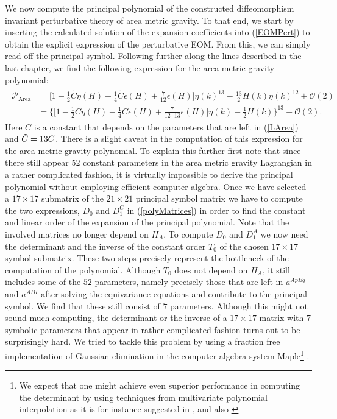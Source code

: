 We now compute the principal polynomial of the constructed diffeomorphism invariant perturbative theory of area metric gravity. To that end, we start by inserting the calculated solution of the expansion coefficients into (\ref{EOMPert}) to obtain the explicit expression of the perturbative EOM. From this, we can simply read off the principal symbol. Following further along the lines described in the last chapter, we find the following expression for the area metric gravity polynomial:
\begin{align} \label{AreaPoly}
\begin{aligned}
    \mathcal{P}_{\text{Area}} &= \bigl[1 - \frac{1}{2} \tilde{C}\eta(H) - \frac{1}{4} \tilde{C} \epsilon(H) + \frac{7}{12} \epsilon(H) \bigr] \eta(k)^{13} - \frac{13}{2}H(k) \eta(k)^{12} + \mathcal{O}(2) \\
    &=\bigl\{  \bigl[ 1 - \frac{1}{2} C \eta(H) - \frac{1}{4} C \epsilon(H) +  \frac{7}{12\cdot13} \epsilon(H) \bigr] \eta(k) - \frac{1}{2} H(k)       \bigr\}^{13} + \mathcal{O}(2).
\end{aligned}
\end{align}
Here $C$ is a constant that depends on the parameters that are left in (\ref{LArea}) and $\Tilde{C} = 13 C$.
There is a slight caveat in the computation of this expression for the area metric gravity polynomial. 
To explain this further first note that since there still appear $52$ constant parameters in the area metric gravity Lagrangian in a rather complicated fashion, it is virtually impossible to derive the principal polynomial without employing efficient computer algebra. Once we have selected a $17 \times 17$ submatrix of the $21 \times 21$ principal symbol matrix we have to compute the two expressions, $D_0$ and $D_{1}^C$ in (\ref{polyMatrices}) in order to find the constant and linear order of the expansion of the principal polynomial. Note that the involved matrices no longer depend on $H_A$. To compute $D_0$ and $D_1^A$ we now need the determinant and the inverse of the constant order $T_0$ of the chosen $17 \times 17$ symbol submatrix. These two steps precisely represent the bottleneck of the computation of the polynomial. Although $T_0$ does not depend on $H_A$, it still includes some of the $52$ parameters, namely precisely those that are left in $a^{ApBq}$ and $a^{ABI}$ after solving the equivariance equations and contribute to the principal symbol. We find that these still consist of $7$ parameters. Although this might not sound much computing, the determinant or the inverse of a $17 \times 17$ matrix with $7$ symbolic parameters that appear in rather complicated fashion turns out to be surprisingly hard. We tried to tackle this problem by using a fraction free implementation of Gaussian elimination in the computer algebra system Maple\footnote{We expect that one might achieve even superior performance in computing the determinant by using techniques from multivariate polynomial interpolation as it is for instance suggested in \cite{Qin2018}, \cite{MARCO2004749} and also \cite{articleDet}} \cite{Maple}.

